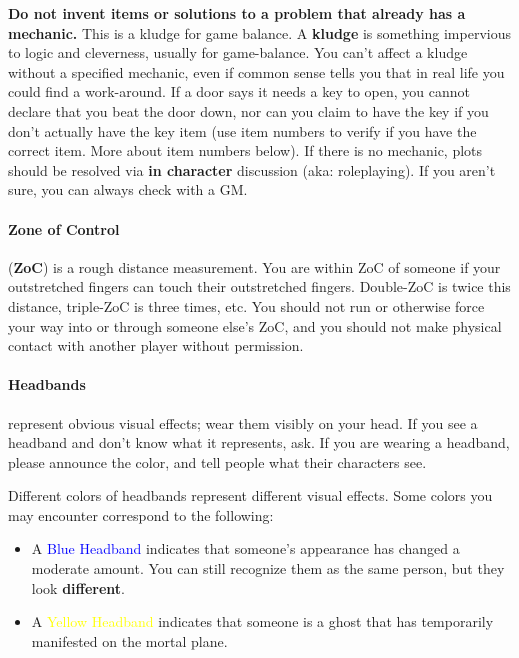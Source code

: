 \documentclass[sheet]{GL2020}
\begin{document}
\textbf{Do not invent items or solutions to a problem that already has a mechanic.} This is a kludge for game balance. A \textbf{kludge} is something impervious to logic and cleverness, usually for game-balance. You can't affect a kludge without a specified mechanic, even if common sense tells you that in real life you could find a work-around. If a door says it needs a key to open, you cannot declare that you beat the door down, nor can you claim to have the key if you don't actually have the key item (use item numbers to verify if you have the correct item. More about item numbers below). If there is no mechanic, plots should be resolved via \textbf{in character} discussion (aka: roleplaying). If you aren't sure, you can always check with a GM. 

\paragraph{Zone of Control} ({\bf ZoC}) is a rough distance measurement. You are within ZoC of someone if your outstretched fingers can touch their outstretched fingers. Double-ZoC is twice this distance, triple-ZoC is three times, etc. You should not run or otherwise force your way into or through someone else's ZoC, and you should not make physical contact with another player without permission.

\paragraph{Headbands} represent obvious visual effects; wear them visibly on your head. If you see a headband and don't know what it represents, ask. If you are wearing a headband, please announce the color, and tell people what their characters see.

Different colors of headbands represent different visual effects. Some colors you may encounter correspond to the following:
\begin{itemize}
	\item A \textcolor{blue}{Blue Headband} indicates that someone’s appearance has changed a moderate amount. You can still recognize them as the same person, but they look \textbf{different}.
	\item A \textcolor{yellow}{Yellow Headband} indicates that someone is a ghost that has temporarily manifested on the mortal plane.
\end{itemize}
\end{document}
